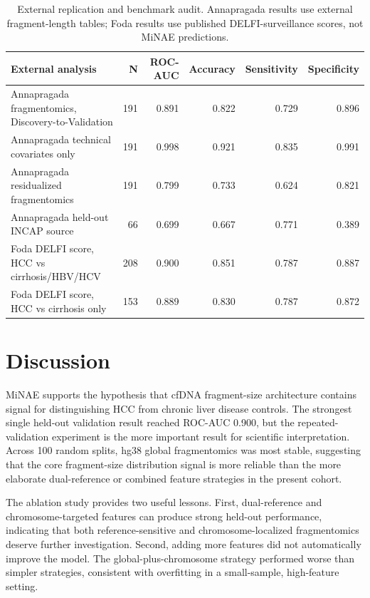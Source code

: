 \documentclass[conference]{IEEEtran}
\begin{document}
\begin{table}[t]
\centering
\caption{External replication and benchmark audit. Annapragada results use external fragment-length tables; Foda results use published DELFI-surveillance scores, not MiNAE predictions.}
\label{tab:external}
\begin{tabular}{lrrrrr}
\toprule
External analysis & N & ROC-AUC & Accuracy & Sensitivity & Specificity \\
\midrule
Annapragada fragmentomics, Discovery-to-Validation & 191 & 0.891 & 0.822 & 0.729 & 0.896 \\
Annapragada technical covariates only & 191 & 0.998 & 0.921 & 0.835 & 0.991 \\
Annapragada residualized fragmentomics & 191 & 0.799 & 0.733 & 0.624 & 0.821 \\
Annapragada held-out INCAP source & 66 & 0.699 & 0.667 & 0.771 & 0.389 \\
Foda DELFI score, HCC vs cirrhosis/HBV/HCV & 208 & 0.900 & 0.851 & 0.787 & 0.887 \\
Foda DELFI score, HCC vs cirrhosis only & 153 & 0.889 & 0.830 & 0.787 & 0.872 \\
\bottomrule
\end{tabular}
\end{table}

\section{Discussion}
MiNAE supports the hypothesis that cfDNA fragment-size architecture contains signal for distinguishing HCC from chronic liver disease controls. The strongest single held-out validation result reached ROC-AUC 0.900, but the repeated-validation experiment is the more important result for scientific interpretation. Across 100 random splits, hg38 global fragmentomics was most stable, suggesting that the core fragment-size distribution signal is more reliable than the more elaborate dual-reference or combined feature strategies in the present cohort.

The ablation study provides two useful lessons. First, dual-reference and chromosome-targeted features can produce strong held-out performance, indicating that both reference-sensitive and chromosome-localized fragmentomics deserve further investigation. Second, adding more features did not automatically improve the model. The global-plus-chromosome strategy performed worse than simpler strategies, consistent with overfitting in a small-sample, high-feature setting.
\end{document}
